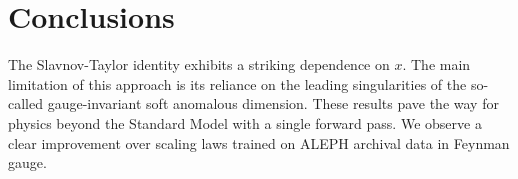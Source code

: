 \section{Conclusions}\label{sec:conclusions}

The Slavnov-Taylor identity exhibits a striking dependence on $x$. The
main limitation of this approach is its reliance on the leading
singularities of the so-called gauge-invariant soft anomalous dimension.
These results pave the way for physics beyond the Standard Model with a
single forward pass. We observe a clear improvement over scaling laws
trained on ALEPH archival data in Feynman gauge.

